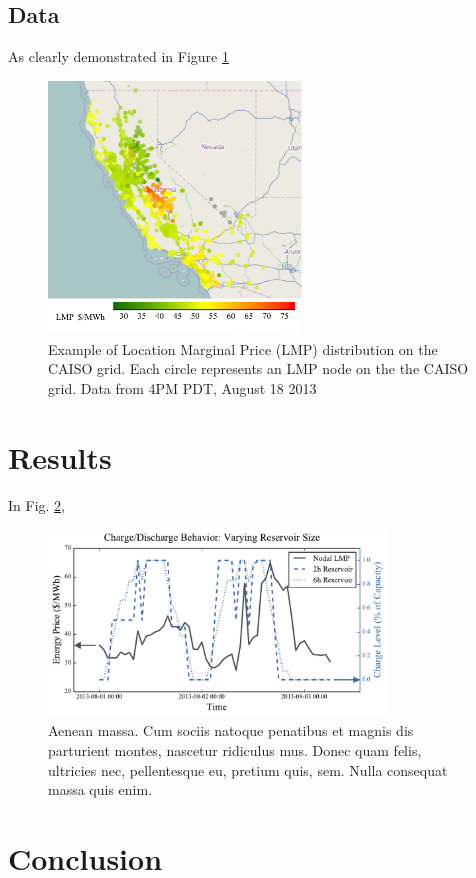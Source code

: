 \subsection{Data}
\lipsum[2] As clearly demonstrated in Figure \ref{fig:datamap}

\begin{figure}
\centering
\includegraphics[trim = 0mm 0mm 0mm 0mm, clip, width=0.6\textwidth]{Figures/unprocessed_LMP_map.png}
\caption{Example of Location Marginal Price (LMP) distribution on the CAISO grid. Each circle represents an LMP node on the the CAISO grid. Data from 4PM PDT, August 18 2013}
\label{fig:datamap}
\end{figure}

\section{Results}
In Fig. \ref{fig:chargesize}, \lipsum[66]

\begin{figure}
\centering
\includegraphics[trim = 0mm 0mm 0mm 0mm, clip, width=0.8\textwidth]{Figures/chargeValidation_varyingSize}
\caption{ Aenean massa. Cum sociis natoque penatibus et magnis dis parturient montes, nascetur ridiculus mus. Donec quam felis, ultricies nec, pellentesque eu, pretium quis, sem. Nulla consequat massa quis enim. }
\label{fig:chargesize}
\end{figure}

\lipsum[2-3]


\section{Conclusion}
\lipsum[22]

